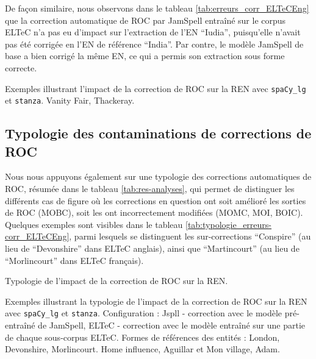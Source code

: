 De façon similaire, nous observons dans le tableau \ref{tab:erreurs_corr_ELTeCEng} que la correction automatique de ROC par JamSpell entraîné sur le corpus ELTeC n'a pas eu d'impact sur l'extraction de l'EN ``Iudia'', puisqu'elle n'avait pas été corrigée en l'EN de référence ``India''. Par contre, le modèle JamSpell de base a bien corrigé la même EN, ce qui a permis son extraction sous forme correcte.
\begin{table}[h!]
\small
    \centering
   
    \caption{Exemples illustrant l'impact de la correction de ROC sur la REN avec \texttt{spaCy\_lg} et \texttt{stanza}. {\normalfont Vanity Fair}, Thackeray.}
    \label{tab:erreurs_corr_ELTeCEng}
\end{table}


\subsection{Typologie des contaminations de corrections de ROC}
Nous nous appuyons également sur une typologie des corrections automatiques de ROC, résumée dans le tableau \ref{tab:res-analyses}, qui permet de distinguer les différents cas de figure où les corrections en question ont soit amélioré les sorties de ROC (MOBC), soit les ont incorrectement modifiées (MOMC, MOI, BOIC). Quelques exemples sont visibles dans le tableau \ref{tab:typologie_erreurs-corr_ELTeCEng}, 
parmi lesquels se distinguent les sur-corrections ``Conspire'' 
(au lieu de ``Devonshire'' 
dans ELTeC anglais), ainsi que ``Martincourt'' (au lieu de ``Morlincourt'' dans ELTeC français).



\begin{table}[h!]
\small
    \centering
    
    \caption{Typologie de l'impact de la correction de ROC sur la REN.  }
    \label{tab:res-analyses}
\end{table}

\begin{table}[h!]
\small
    \centering
   
    \caption{Exemples illustrant la typologie de l'impact de la correction de ROC sur la REN avec \texttt{spaCy\_lg} et \texttt{stanza}. Configuration : Jspll - correction avec le modèle pré-entraîné de JamSpell, ELTeC - correction avec le modèle entraîné sur une partie de chaque sous-corpus ELTeC. Formes de références des entités : London, Devonshire, Morlincourt. {\normalfont Home influence}, Aguillar et {\normalfont Mon village}, Adam.}
    \label{tab:typologie_erreurs-corr_ELTeCEng}
\end{table}

